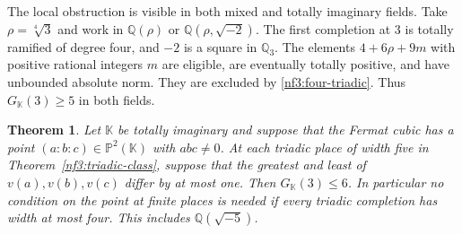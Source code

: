 \documentclass[11pt,letterpaper]{article}
\newtheorem{theorem}{Theorem}[section]
\theoremstyle{definition}
\numberwithin{equation}{section}
\begin{document}
The local obstruction is visible in both mixed and totally imaginary
fields. Take $\rho=\sqrt[4]{3}$ and work in $\mathbb Q(\rho)$ or
$\mathbb Q(\rho,\sqrt{-2})$. The first completion at $3$ is totally
ramified of degree four, and $-2$ is a square in $\mathbb Q_3$.
The elements $4+6\rho+9m$ with positive rational integers $m$ are
eligible, are eventually totally positive, and have unbounded
absolute norm. They are excluded by \eqref{nf3:four-triadic}.
Thus $G_{\mathbb K}(3)\ge5$ in both fields.

\begin{theorem}\label{nf3:fermat-six-local}
Let $\mathbb K$ be totally imaginary and suppose that the Fermat cubic
has a point $(a:b:c)\in\mathbb P^2(\mathbb K)$ with $abc\ne0$.
At each triadic place of width five in Theorem~\ref{nf3:triadic-class},
suppose that the greatest and least of $v(a),v(b),v(c)$ differ by at
most one. Then $G_{\mathbb K}(3)\le6$. In particular no condition
on the point at finite places is needed if every triadic completion
has width at most four. This includes $\mathbb Q(\sqrt{-5})$.
\end{theorem}
\end{document}
